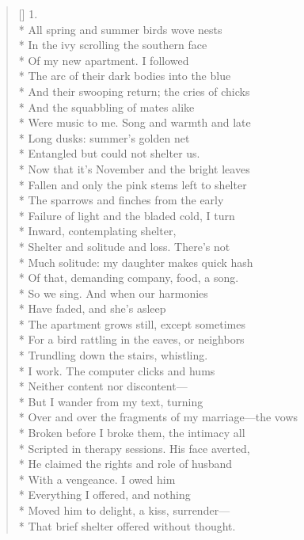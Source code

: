 \label{ch:in_the_season_without_mercy}
\settowidth{\versewidth}{ \qquad  \qquad There's the danger, too, of remembering}
\begin{verse}[\versewidth]
1.\\*
All spring and summer birds wove nests\\*
In the ivy scrolling the southern face\\*
Of my new apartment.  I followed\\*
The arc of their dark bodies into the blue\\*
And their swooping return; the cries of chicks\\*
And the squabbling of mates alike\\*
Were music to me.  Song and warmth and late\\*
Long dusks: summer's golden net\\*
Entangled but could not shelter us.\\*
Now that it's November and the bright leaves\\*
Fallen and only the pink stems left to shelter\\*
The sparrows and finches from the early\\*
Failure of light and the bladed cold, I turn\\*
Inward, contemplating shelter,\\*
Shelter and solitude and loss.  There's not \\*
Much solitude: my daughter makes quick hash\\*
Of that, demanding company, food, a song.\\*
So we sing.  And when our harmonies \\*
Have faded, and she's asleep\\*
The apartment grows still, except sometimes\\*
For a bird rattling in the eaves, or neighbors\\*
Trundling down the stairs, whistling.\\*
I work. The computer clicks and hums\\*
Neither content nor discontent---\\*
But I wander from my text, turning\\*
Over and over the fragments of my marriage---the vows\\*
Broken before I broke them, the intimacy all\\*
Scripted in therapy sessions.  His face averted, \\*
He claimed the rights and role of husband\\*
With a vengeance.  I owed him\\*
Everything I offered, and nothing\\*
Moved him to delight, a kiss, surrender---\\*
That brief shelter offered without thought.


\end{verse}

